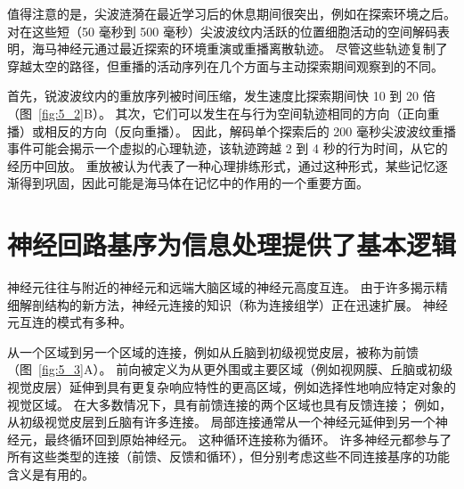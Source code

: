 值得注意的是，尖波涟漪在最近学习后的休息期间很突出，例如在探索环境之后。
对在这些短（50 毫秒到 500 毫秒）尖波波纹内活跃的位置细胞活动的空间解码表明，海马神经元通过最近探索的环境重演或重播离散轨迹。
尽管这些轨迹复制了穿越太空的路径，但重播的活动序列在几个方面与主动探索期间观察到的不同。


首先，锐波波纹内的重放序列被时间压缩，发生速度比探索期间快 10 到 20 倍（图~\ref{fig:5_2}B）。 
其次，它们可以发生在与行为空间轨迹相同的方向（正向重播）或相反的方向（反向重播）。
因此，解码单个探索后的 200 毫秒尖波波纹重播事件可能会揭示一个虚拟的心理轨迹，该轨迹跨越 2 到 4 秒的行为时间，从它的经历中回放。
重放被认为代表了一种心理排练形式，通过这种形式，某些记忆逐渐得到巩固，因此可能是海马体在记忆中的作用的一个重要方面。



\section{神经回路基序为信息处理提供了基本逻辑}

神经元往往与附近的神经元和远端大脑区域的神经元高度互连。
由于许多揭示精细解剖结构的新方法，神经元连接的知识（称为连接组学）正在迅速扩展。
神经元互连的模式有多种。


从一个区域到另一个区域的连接，例如从丘脑到初级视觉皮层，被称为前馈（图~\ref{fig:5_3}A）。 
前向被定义为从更外围或主要区域（例如视网膜、丘脑或初级视觉皮层）延伸到具有更复杂响应特性的更高区域，例如选择性地响应特定对象的视觉区域。
在大多数情况下，具有前馈连接的两个区域也具有反馈连接；
例如，从初级视觉皮层到丘脑有许多连接。
局部连接通常从一个神经元延伸到另一个神经元，最终循环回到原始神经元。
这种循环连接称为循环。
许多神经元都参与了所有这些类型的连接（前馈、反馈和循环），但分别考虑这些不同连接基序的功能含义是有用的。


